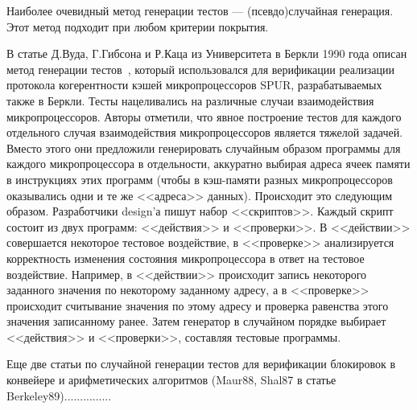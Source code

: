 \documentclass[14pt]{extreport}
\begin{document}
Наиболее очевидный метод генерации тестов --- (псевдо)случайная генерация. Этот метод подходит при любом критерии покрытия.


В статье Д.Вуда, Г.Гибсона и Р.Каца из Университета в Беркли 1990 года описан метод генерации тестов~\cite{Berkeley89}, который использовался для верификации реализации протокола когерентности кэшей микропроцессоров SPUR, разрабатываемых также в Беркли. Тесты нацеливались на различные случаи взаимодействия микропроцессоров. Авторы отметили, что явное построение тестов для каждого отдельного случая взаимодействия микропроцессоров является тяжелой задачей. Вместо этого они предложили генерировать случайным образом программы для каждого микропроцессора в отдельности, аккуратно выбирая адреса ячеек памяти в инструкциях этих программ (чтобы в кэш-памяти разных микропроцессоров оказывались одни и те же <<адреса>> данных). Происходит это следующим образом. Разработчики design'а пишут набор <<скриптов>>. Каждый скрипт состоит из двух программ: <<действия>> и <<проверки>>. В <<действии>> совершается некоторое тестовое воздействие, в <<проверке>> анализируется корректность изменения состояния микропроцессора в ответ на тестовое воздействие. Например, в <<действии>> происходит запись некоторого заданного значения по некоторому заданному адресу, а в <<проверке>> происходит считывание значения по этому адресу и проверка равенства этого значения записанному ранее. Затем генератор в случайном порядке выбирает <<действия>> и <<проверки>>, составляя тестовые программы.

Еще две статьи по случайной генерации тестов для верификации блокировок в конвейере и арифметических алгоритмов (Maur88, Shal87 в статье Berkeley89)...............
\end{document}
